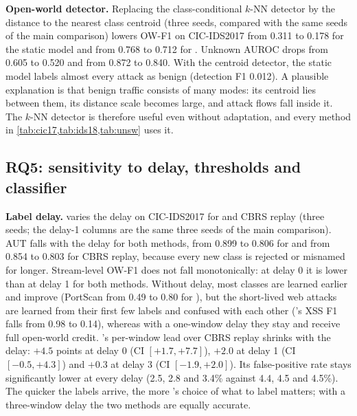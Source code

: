 \textbf{Open-world detector.} Replacing the class-conditional $k$-NN detector by the distance to the nearest class
centroid (three seeds, compared with the same seeds of the main comparison) lowers OW-F1 on CIC-IDS2017 from 0.311
to 0.178 for the static model and from 0.768 to 0.712 for \nova{}.
Unknown AUROC drops from 0.605 to 0.520 and from 0.872 to 0.840. With the centroid detector, the static model
labels almost every attack as benign (detection F1 0.012). A plausible explanation is that benign traffic
consists of many modes: its centroid lies between them, its distance scale becomes large, and attack flows fall
inside it. The $k$-NN
detector is therefore useful even without adaptation, and every method in \cref{tab:cic17,tab:ids18,tab:unsw} uses
it.

\subsection{RQ5: sensitivity to delay, thresholds and classifier}
\label{sec:res-sens}
\textbf{Label delay.}  varies the delay on CIC-IDS2017 for \nova{} and CBRS replay (three seeds;
the delay-1 columns are the same three seeds of the main comparison). AUT falls with the delay for both methods,
from 0.899 to 0.806 for \nova{} and from 0.854 to 0.803 for CBRS replay, because every new class is rejected or
misnamed for longer. Stream-level OW-F1 does not fall monotonically: at delay 0 it is lower than at delay 1 for
both methods. Without delay, most classes are learned earlier and improve (PortScan from 0.49 to 0.80 for
\nova{}), but the short-lived web attacks are learned from their first few labels and confused with each other
(\nova{}'s XSS F1 falls from 0.98 to 0.14), whereas with a one-window delay they stay \unk{} and receive full
open-world credit. \nova{}'s per-window lead over CBRS replay shrinks with the delay: $+4.5$ points at delay 0 (CI
$[+1.7, +7.7]$), $+2.0$ at delay 1 (CI $[-0.5, +4.3]$) and $+0.3$ at delay 3 (CI $[-1.9, +2.0]$). Its false-positive
rate stays significantly lower at every delay (2.5, 2.8 and 3.4\% against 4.4, 4.5 and 4.5\%). The quicker the
labels arrive, the more \nova{}'s choice of what to label matters; with a three-window delay the two methods are
equally accurate.

\begin{table}[t]
\centering
\caption{Label delay on CIC-IDS2017 (budget 10\%): OW-F1, AUT and FPR (\%), mean over three seeds.}
\label{tab:delay}
\small
{}
\end{table}

